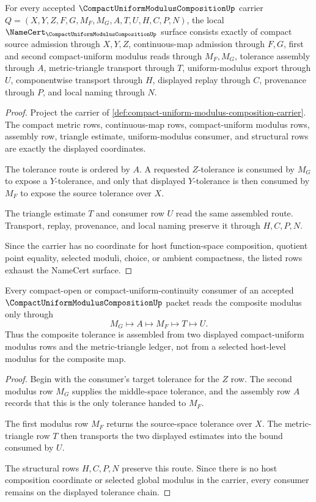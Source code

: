 \begin{theorem}
\label{thm:compact-uniform-modulus-composition-namecert-obligations}
For every accepted $\CompactUniformModulusCompositionUp$ carrier $Q=(X,Y,Z,F,G,M_F,M_G,A,T,U,H,C,P,N)$, the local $\NameCert_{\CompactUniformModulusCompositionUp}$ surface consists exactly of compact source admission through $X,Y,Z$, continuous-map admission through $F,G$, first and second compact-uniform modulus reads through $M_F,M_G$, tolerance assembly through $A$, metric-triangle transport through $T$, uniform-modulus export through $U$, componentwise transport through $H$, displayed replay through $C$, provenance through $P$, and local naming through $N$.
\end{theorem}
\begin{proof}
Project the carrier of \autoref{def:compact-uniform-modulus-composition-carrier}. The compact metric rows, continuous-map rows, compact-uniform modulus rows, assembly row, triangle estimate, uniform-modulus consumer, and structural rows are exactly the displayed coordinates.

The tolerance route is ordered by $A$. A requested $Z$-tolerance is consumed by $M_G$ to expose a $Y$-tolerance, and only that displayed $Y$-tolerance is then consumed by $M_F$ to expose the source tolerance over $X$.

The triangle estimate $T$ and consumer row $U$ read the same assembled route. Transport, replay, provenance, and local naming preserve it through $H,C,P,N$.

Since the carrier has no coordinate for host function-space composition, quotient point equality, selected moduli, choice, or ambient compactness, the listed rows exhaust the NameCert surface.
\end{proof}

\begin{theorem}
\label{thm:compact-uniform-modulus-composition-tolerance-route}
Every compact-open or compact-uniform-continuity consumer of an accepted $\CompactUniformModulusCompositionUp$ packet reads the composite modulus only through
$$
M_G \longmapsto A \longmapsto M_F \longmapsto T \longmapsto U .
$$
Thus the composite tolerance is assembled from two displayed compact-uniform modulus rows and the metric-triangle ledger, not from a selected host-level modulus for the composite map.
\end{theorem}
\begin{proof}
Begin with the consumer's target tolerance for the $Z$ row. The second modulus row $M_G$ supplies the middle-space tolerance, and the assembly row $A$ records that this is the only tolerance handed to $M_F$.

The first modulus row $M_F$ returns the source-space tolerance over $X$. The metric-triangle row $T$ then transports the two displayed estimates into the bound consumed by $U$.

The structural rows $H,C,P,N$ preserve this route. Since there is no host composition coordinate or selected global modulus in the carrier, every consumer remains on the displayed tolerance chain.
\end{proof}


